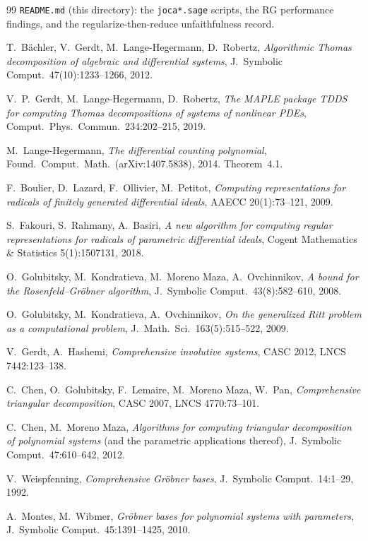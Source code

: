 \documentclass[11pt]{article}
\newcommand{\code}[1]{\texttt{#1}}
\begin{document}
\begin{thebibliography}{99}
 \code{README.md} (this directory): the \code{joca*.sage}
scripts, the RG performance findings, and the regularize-then-reduce
unfaithfulness record.

 T.~B\"achler, V.~Gerdt, M.~Lange-Hegermann, D.~Robertz,
\emph{Algorithmic Thomas decomposition of algebraic and differential
systems}, J.~Symbolic Comput.\ 47(10):1233--1266, 2012.

 V.~P.~Gerdt, M.~Lange-Hegermann, D.~Robertz, \emph{The MAPLE
package TDDS for computing Thomas decompositions of systems of nonlinear
PDEs}, Comput.\ Phys.\ Commun.\ 234:202--215, 2019.

 M.~Lange-Hegermann, \emph{The differential counting
polynomial}, Found.\ Comput.\ Math.\ (arXiv:1407.5838), 2014. Theorem~4.1.

 F.~Boulier, D.~Lazard, F.~Ollivier, M.~Petitot,
\emph{Computing representations for radicals of finitely generated
differential ideals}, AAECC 20(1):73--121, 2009.

 S.~Fakouri, S.~Rahmany, A.~Basiri, \emph{A new algorithm
for computing regular representations for radicals of parametric
differential ideals}, Cogent Mathematics \& Statistics 5(1):1507131, 2018.

 O.~Golubitsky, M.~Kondratieva, M.~Moreno Maza,
A.~Ovchinnikov, \emph{A bound for the Rosenfeld--Gr\"obner algorithm},
J.~Symbolic Comput.\ 43(8):582--610, 2008.

 O.~Golubitsky, M.~Kondratieva, A.~Ovchinnikov, \emph{On
the generalized Ritt problem as a computational problem}, J.~Math.\ Sci.\
163(5):515--522, 2009.

 V.~Gerdt, A.~Hashemi, \emph{Comprehensive involutive
systems}, CASC 2012, LNCS 7442:123--138.

 C.~Chen, O.~Golubitsky, F.~Lemaire, M.~Moreno Maza, W.~Pan,
\emph{Comprehensive triangular decomposition}, CASC 2007, LNCS 4770:73--101.

 C.~Chen, M.~Moreno Maza, \emph{Algorithms for
computing triangular decomposition of polynomial systems} (and the parametric
applications thereof), J.~Symbolic Comput.\ 47:610--642, 2012.

 V.~Weispfenning, \emph{Comprehensive Gr\"obner bases},
J.~Symbolic Comput.\ 14:1--29, 1992.

 A.~Montes, M.~Wibmer, \emph{Gr\"obner bases for
polynomial systems with parameters}, J.~Symbolic Comput.\ 45:1391--1425,
2010.


\end{thebibliography}
\end{document}

